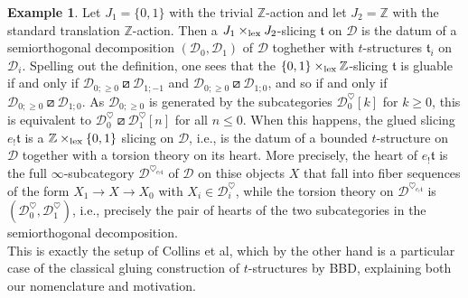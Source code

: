 \documentclass{article}
\theoremstyle{definition}
\newtheorem{exmp}[thm]{Example}
\newcommand{\Z}{\mathbb{Z}}
\newcommand{\tee}{\mathfrak{t}}
\newcommand{\orth}{\boxslash}
\newcommand{\lex}{\times_{\textnormal{lex}}}
\begin{document}
\begin{exmp}\label{example:bbd} Let $J_1=\{0,1\}$ with the trivial $\Z$-action and let $J_2=\Z$ with the standard translation $\Z$-action.  Then a $J_1\lex J_2$-slicing $\tee$ on $\mathscr{D}$ is the datum of a semiorthogonal decomposition $(\mathscr{D}_0,\mathscr{D}_1)$ of $\mathscr{D}$ toghether with $t$-structures $\tee_i$ on $\mathscr{D}_i$. Spelling out the definition, one sees that the $\{0,1\}\lex \Z$-slicing $\tee$ is gluable if and only if 
$\mathscr{D}_{0;\geq 0}\orth \mathscr{D}_{1;-1}$ and $\mathscr{D}_{0;\geq 0}\orth \mathscr{D}_{1;0}$, and so if and only if $\mathscr{D}_{0;\geq 0}\orth \mathscr{D}_{1;0}$. {\color{red}As  $\mathscr{D}_{0;\geq 0}$ is generated by the subcategories $\mathscr{D}_{0}^\heartsuit[k]$ for $k\geq 0$, this is equivalent to $\mathscr{D}_{0}^\heartsuit\orth\mathscr{D}_{1}^\heartsuit[n]$ for all $n\leq 0$.} When this happens, the glued slicing $e_!\tee$ is a $\Z\lex\{0,1\}$ slicing on $\mathscr{D}$, i.e., is the datum of a bounded $t$-structure on $\mathscr{D}$ together with a torsion theory on its heart. More precisely, the heart of $e_!\tee$ is the full $\infty$-subcategory $\mathscr{D}^{\heartsuit_{e_!\tee}}$ of $\mathscr{D}$ on thise objects $X$ that fall into fiber sequences of the form $X_1\to X\to X_0$ with $X_i\in \mathscr{D}_i^\heartsuit$, while the torsion theory on $\mathscr{D}^{\heartsuit_{e_!\tee}}$ is
  $(\mathscr{D}_0^{\heartsuit},\mathscr{D}_1^{\heartsuit})$, i.e., precisely the pair of hearts of the two subcategories in the semiorthogonal decomposition. \\
  This is exactly the setup of {\color{red} Collins et al}, which by the other hand is a particular case of the classical gluing construction of $t$-structures by {\color{red} BBD}, explaining both our nomenclature and motivation.
\end{exmp}
\end{document}
